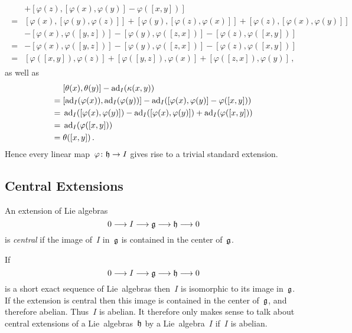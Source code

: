 \begin{fluff}
\begin{gather*}
\begin{aligned}
      {}&
      + [ \varphi(z), [\varphi(x), \varphi(y)] - \varphi([x,y]) ]
      \\
      ={}&
      [ \varphi(x), [\varphi(y), \varphi(z)] ]
      + [ \varphi(y), [\varphi(z), \varphi(x)] ]
      + [ \varphi(z), [\varphi(x), \varphi(y)] ]
      \\
      {}&
      - [ \varphi(x), \varphi([y,z]) ]
      - [ \varphi(y), \varphi([z,x]) ]
      - [ \varphi(z), \varphi([x,y]) ]
      \\
      ={}&
      - [ \varphi(x), \varphi([y,z]) ]
      - [ \varphi(y), \varphi([z,x]) ]
      - [ \varphi(z), \varphi([x,y]) ]
      \\
      ={}&
      [ \varphi([x,y]), \varphi(z) ]
      + [ \varphi([y,z]), \varphi(x) ]
      + [ \varphi([z,x]), \varphi(y) ] \,,
    \end{aligned}
  \end{gather*}
  as well as
  \begin{align*}
    {}&
    [\theta(x), \theta(y)] - \operatorname{ad}_I( \kappa(x,y) )
    \\
    ={}&
    [ \operatorname{ad}_I(\varphi(x)), \operatorname{ad}_I(\varphi(y)) ] - \operatorname{ad}_I( [\varphi(x), \varphi(y)] - \varphi([x,y]) )
    \\
    ={}&
    \operatorname{ad}_I( [\varphi(x), \varphi(y)] ) - \operatorname{ad}_I( [\varphi(x), \varphi(y)] ) + \operatorname{ad}_I( \varphi([x,y]) )
    \\
    ={}&
    \operatorname{ad}_I( \varphi([x,y]) )
    \\
    ={}&
    \theta([x,y]) \,.
  \end{align*}
  Hence every linear map~$\varphi \colon \hlie \to I$ gives rise to a trivial standard extension.
\end{fluff}



\subsection{Central Extensions}


\begin{definition}
  An extension of Lie algebras
  \[
    0 \to I \to \glie \to \hlie \to 0
  \]
  is \emph{central} if the image of~$I$ in~$\mathfrak{g}$ is contained in the center of~$\mathfrak{g}$.
\end{definition}


\begin{remark}
  If
  \[
    0 \to I \to \glie \to \hlie \to 0
  \]
  is a short exact sequence of Lie~algebras then~$I$ is isomorphic to its image in~$\mathfrak{g}$.
  If the extension is central then this image is contained in the center of~$\mathfrak{g}$, and therefore abelian. 
  Thus~$I$ is abelian.
  It therefore only makes sense to talk about central extensions of a Lie~algebras~$\mathfrak{h}$ by a Lie~algebra~$I$ if~$I$ is abelian.
\end{remark}


